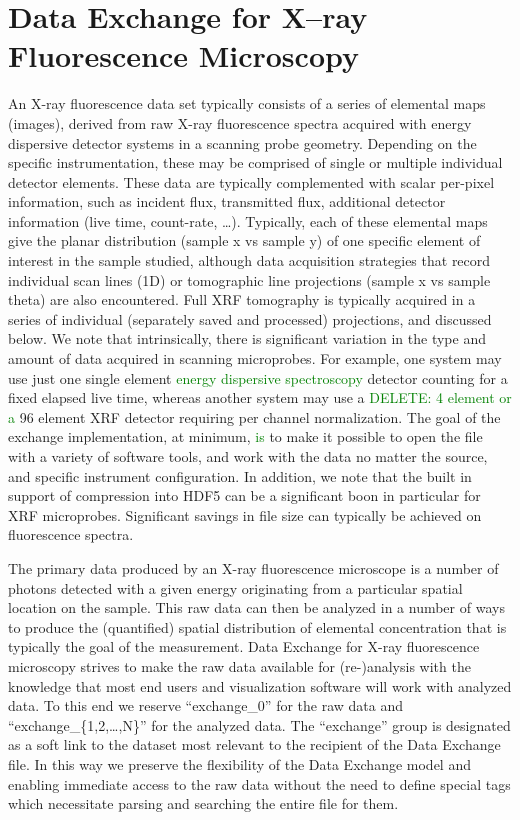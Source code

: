 \documentclass[pdf]{iucr}              %
\begin{document}
\section{Data Exchange for X--ray Fluorescence Microscopy}

An X-ray fluorescence data set typically consists of a series of elemental maps (images), derived from raw X-ray fluorescence spectra acquired with energy dispersive detector systems in a scanning probe geometry. Depending on the specific instrumentation, these may be comprised of single or multiple individual detector elements. These data are typically complemented with scalar per-pixel information, such as incident flux, transmitted flux, additional detector information (live time, count-rate, \ldots). Typically, each of these elemental maps give the planar distribution (sample x vs sample y) of one specific element of interest in the sample studied, although data acquisition strategies that record individual scan lines (1D) or tomographic line projections (sample x vs sample theta) are also encountered. Full XRF tomography is typically acquired in a series of individual (separately saved and processed) projections, and discussed below. We note that intrinsically, there is significant variation in the type and amount of data acquired in scanning microprobes. For example, one system may use just one single element \textcolor{green}{energy dispersive spectroscopy} detector counting for a fixed elapsed live time, whereas another system may use a \textcolor{green}{DELETE: 4 element or a} 96 element XRF detector requiring per channel normalization. The goal of the exchange implementation, at minimum, \textcolor{green}{is} to make it possible to open the file with a variety of software tools, and work with the data no matter the source, and specific instrument configuration. In addition, we note that the built in support of compression into HDF5 can be a significant boon in particular for XRF microprobes. Significant savings in file size can typically be achieved on fluorescence spectra. 

The primary data produced by an X-ray fluorescence microscope is a number of photons detected with a given energy originating from a particular spatial location on the sample. This raw data can then be analyzed in a number of ways to produce the (quantified) spatial distribution of elemental concentration that is typically the goal of the measurement. Data Exchange for X-ray fluorescence microscopy strives to make the raw data available for (re-)analysis with the knowledge that most end users and visualization software will work with analyzed data. To this end we reserve ``exchange\_0'' for the raw data and ``exchange\_\{1,2,\ldots,N\}'' for the analyzed data. The ``exchange'' group is designated as a soft link to the dataset most relevant to the recipient of the Data Exchange file. In this way we preserve the flexibility of the Data Exchange model and enabling immediate access to the raw data without the need to define special tags which necessitate parsing and searching the entire file for them.
\end{document}
